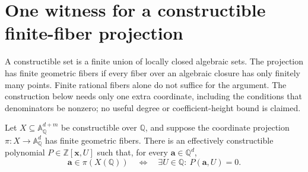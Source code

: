 \section{One witness for a constructible finite-fiber projection}
\label{sec:one-finite-variable}

A constructible set is a finite union of locally closed algebraic sets.
The projection has finite geometric fibers if every fiber over an
algebraic closure has only finitely many points. Finite rational fibers
alone do not suffice for the argument. The construction below needs only
one extra coordinate, including the conditions that denominators be
nonzero; no useful degree or coefficient-height bound is claimed.

\begin{theorem}\label{thm:finite-fibre-one-variable}
Let $X\subseteq\mathbb A^{d+m}_{\mathbb Q}$ be constructible over
$\mathbb Q$, and suppose the coordinate projection
$\pi:X\to\mathbb A^d_{\mathbb Q}$ has finite geometric fibers.
There is an effectively constructible polynomial
$P\in\mathbb Z[\mathbf x,U]$ such that, for every $\mathbf a\in\mathbb Q^d$,
\[
 \mathbf a\in\pi(X(\mathbb Q))
 \quad\Longleftrightarrow\quad
 \exists U\in\mathbb Q:\ P(\mathbf a,U)=0.
\]
\end{theorem}
